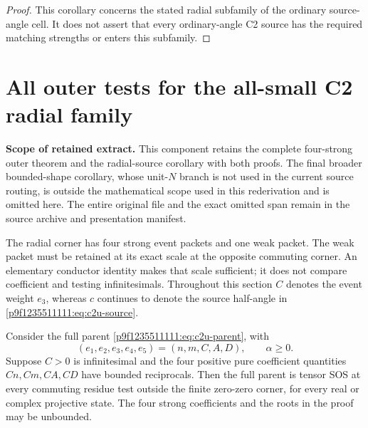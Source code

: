 \begin{proof}
This corollary concerns the stated radial subfamily of the ordinary
source-angle cell.  It does not assert that every ordinary-angle C2
source has the required matching strengths or enters this subfamily.
\end{proof}


\section{\texorpdfstring{All outer tests for the all-small C2 radial family}{All outer tests for the all-small C2 radial family}}
\label{component:pc7dacaa3258e}

\label{pc7dacaa3258e:sec:c2-radial-all-tests}

\noindent\textbf{Scope of retained extract.} This component retains the complete four-strong outer theorem and the radial-source corollary with both proofs. The final broader bounded-shape corollary, whose unit-$N$ branch is not used in the current source routing, is outside the mathematical scope used in this rederivation and is omitted here. The entire original file and the exact omitted span remain in the source archive and presentation manifest.


The radial corner has four strong event packets and one weak packet.
The weak packet must be retained at its exact scale at the opposite
commuting corner.  An elementary conductor identity makes that scale
sufficient; it does not compare coefficient and testing infinitesimals.
Throughout this section $C$ denotes the event weight $e_3$, whereas $c$
continues to denote the source half-angle in \eqref{p9f1235511111:eq:c2u-source}.

\begin{lemma}
\label{pc7dacaa3258e:lem:c2-four-strong-outer}
Consider the full parent \eqref{p9f1235511111:eq:c2u-parent}, with
\[
 (e_1,e_2,e_3,e_4,e_5)=(n,m,C,A,D),\qquad \alpha\geq0.
\]
Suppose $C>0$ is infinitesimal and the four positive pure coefficient
quantities $Cn,Cm,CA,CD$ have bounded reciprocals.  Then the full parent
is tensor SOS at every commuting residue test outside the finite
zero-zero corner, for every real or complex projective state.
The four strong coefficients and the roots in the proof may be unbounded.
\end{lemma}

